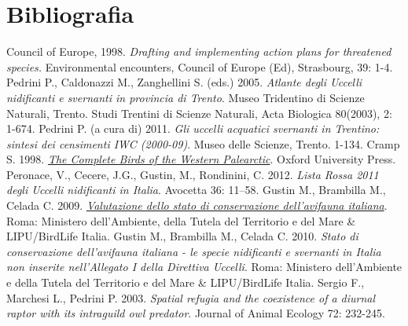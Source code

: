 \documentclass[10pt,twoside,openany,x11names,svgnames,italian,a5paper,dvipsnames,table]{memoir}
\newcommand\chapterillustration{}
\begin{document}
  
\setlength\afterchapskip{10mm}
\chapter{Bibliografia}
\renewcommand\chapterillustration{}
\renewcommand*{\bibname}{}
\begingroup
\renewcommand{\addcontentsline}[3]{}%
\renewcommand{\section}[2]{}%
\begin{thebibliography}{9}
\footnotesize
{} Council of Europe, 1998. \emph{Drafting and implementing action plans for threatened species.} Environmental encounters, Council of Europe (Ed), Strasbourg, 39: 1-4.
 Pedrini P., Caldonazzi M., Zanghellini S. (eds.) 2005. \emph{Atlante degli Uccelli nidificanti e svernanti in provincia di Trento}. Museo Tridentino di Scienze Naturali, Trento. Studi Trentini di Scienze Naturali, Acta Biologica 80(2003), 2: 1-674.
 Pedrini P. (a cura di) 2011. \emph{Gli uccelli acquatici svernanti in Trentino: sintesi dei censimenti IWC (2000-09)}. Museo delle Scienze, Trento. 1-134.
 Cramp S. 1998. \href{http://ciso-coi.it/wp-content/uploads/2012/10/redlist-2011.pdf}{\emph{The Complete Birds of the Western Palearctic}}. Oxford University Press.
 Peronace, V., Cecere, J.G., Gustin, M., Rondinini, C. 2012. \emph{Lista Rossa 2011 degli Uccelli nidificanti in Italia}. Avocetta 36: 11–58.
 Gustin M., Brambilla M., Celada C. 2009. \href{http://www.uccellidaproteggere.it/content/download/4210/46448/file/valutazione_avifauna_italiana_volumeI.pdf}{\emph{Valutazione dello stato di conservazione dell’avifauna italiana}}. Roma: Ministero dell’Ambiente, della Tutela del Territorio e del Mare \& LIPU/BirdLife Italia.
 Gustin M., Brambilla M., Celada C. 2010. \emph{Stato di conservazione dell’avifauna italiana - le specie nidificanti e svernanti in Italia non inserite nell’Allegato I della Direttiva Uccelli}. Roma: Ministero dell’Ambiente e della Tutela del Territorio e del Mare \& LIPU/BirdLife Italia.
 Sergio F., Marchesi L., Pedrini P. 2003. \emph{Spatial refugia and the coexistence of a diurnal raptor with its intraguild owl predator}. Journal of Animal Ecology 72: 232-245.

\end{thebibliography}
\end{document}
